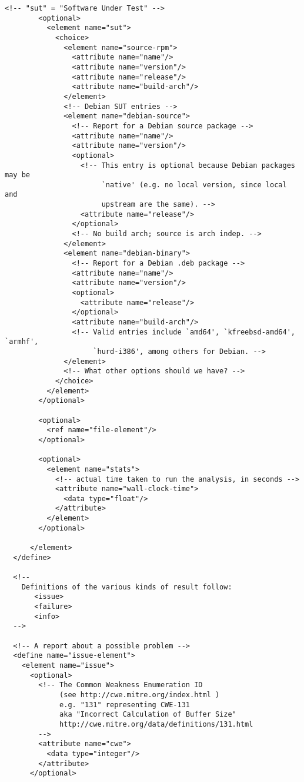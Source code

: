 \begin{lstlisting}[frame=none]
        <!-- "sut" = "Software Under Test" -->
        <optional>
          <element name="sut">
            <choice>
              <element name="source-rpm">
                <attribute name="name"/>
                <attribute name="version"/>
                <attribute name="release"/>
                <attribute name="build-arch"/>
              </element>
              <!-- Debian SUT entries -->
              <element name="debian-source">
                <!-- Report for a Debian source package -->
                <attribute name="name"/>
                <attribute name="version"/>
                <optional>
                  <!-- This entry is optional because Debian packages may be
                       `native' (e.g. no local version, since local and
                       upstream are the same). -->
                  <attribute name="release"/>
                </optional>
                <!-- No build arch; source is arch indep. -->
              </element>
              <element name="debian-binary">
                <!-- Report for a Debian .deb package -->
                <attribute name="name"/>
                <attribute name="version"/>
                <optional>
                  <attribute name="release"/>
                </optional>
                <attribute name="build-arch"/>
                <!-- Valid entries include `amd64', `kfreebsd-amd64', `armhf',
                     `hurd-i386', among others for Debian. -->
              </element>
              <!-- What other options should we have? -->
            </choice>
          </element>
        </optional>

        <optional>
          <ref name="file-element"/>
        </optional>

        <optional>
          <element name="stats">
            <!-- actual time taken to run the analysis, in seconds -->
            <attribute name="wall-clock-time">
              <data type="float"/>
            </attribute>
          </element>
        </optional>

      </element>
  </define>

  <!--
    Definitions of the various kinds of result follow:
       <issue>
       <failure>
       <info>
  -->

  <!-- A report about a possible problem -->
  <define name="issue-element">
    <element name="issue">
      <optional>
        <!-- The Common Weakness Enumeration ID
             (see http://cwe.mitre.org/index.html )
             e.g. "131" representing CWE-131
             aka "Incorrect Calculation of Buffer Size"
             http://cwe.mitre.org/data/definitions/131.html
        -->
        <attribute name="cwe">
          <data type="integer"/>
        </attribute>
      </optional>


\end{lstlisting}
